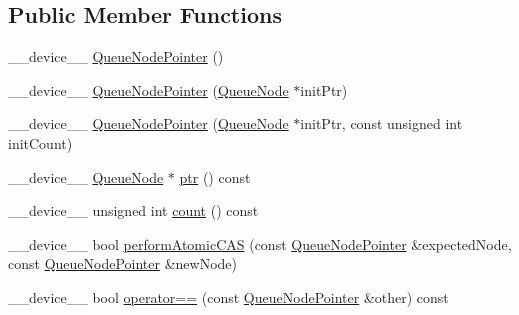 \subsection*{Public Member Functions}
\begin{DoxyCompactItemize}
\item 
\+\_\+\+\_\+device\+\_\+\+\_\+ \mbox{\hyperlink{class_lock_free_queue_g_p_u_1_1_lock_free_queue_1_1_queue_node_pointer_a398bfd1f12b6047f4552486566fb3dc8}{Queue\+Node\+Pointer}} ()
\item 
\+\_\+\+\_\+device\+\_\+\+\_\+ \mbox{\hyperlink{class_lock_free_queue_g_p_u_1_1_lock_free_queue_1_1_queue_node_pointer_aee8f8f4a0fe3b228ab37934d05051f02}{Queue\+Node\+Pointer}} (\mbox{\hyperlink{class_lock_free_queue_g_p_u_1_1_lock_free_queue_1_1_queue_node}{Queue\+Node}} $\ast$init\+Ptr)
\item 
\+\_\+\+\_\+device\+\_\+\+\_\+ \mbox{\hyperlink{class_lock_free_queue_g_p_u_1_1_lock_free_queue_1_1_queue_node_pointer_a5b8f7553a4a723392eb5c4b1ce7e3875}{Queue\+Node\+Pointer}} (\mbox{\hyperlink{class_lock_free_queue_g_p_u_1_1_lock_free_queue_1_1_queue_node}{Queue\+Node}} $\ast$init\+Ptr, const unsigned int init\+Count)
\item 
\+\_\+\+\_\+device\+\_\+\+\_\+ \mbox{\hyperlink{class_lock_free_queue_g_p_u_1_1_lock_free_queue_1_1_queue_node}{Queue\+Node}} $\ast$ \mbox{\hyperlink{class_lock_free_queue_g_p_u_1_1_lock_free_queue_1_1_queue_node_pointer_a3a8f5737220b153b6c3d5411251832cf}{ptr}} () const
\item 
\+\_\+\+\_\+device\+\_\+\+\_\+ unsigned int \mbox{\hyperlink{class_lock_free_queue_g_p_u_1_1_lock_free_queue_1_1_queue_node_pointer_a44656a2bd6b73d9b9028f63b49806bb4}{count}} () const
\item 
\+\_\+\+\_\+device\+\_\+\+\_\+ bool \mbox{\hyperlink{class_lock_free_queue_g_p_u_1_1_lock_free_queue_1_1_queue_node_pointer_a45e5ddb1d0f52a9f0b0b60626aac8b89}{perform\+Atomic\+C\+AS}} (const \mbox{\hyperlink{class_lock_free_queue_g_p_u_1_1_lock_free_queue_1_1_queue_node_pointer}{Queue\+Node\+Pointer}} \&expected\+Node, const \mbox{\hyperlink{class_lock_free_queue_g_p_u_1_1_lock_free_queue_1_1_queue_node_pointer}{Queue\+Node\+Pointer}} \&new\+Node)
\item 
\+\_\+\+\_\+device\+\_\+\+\_\+ bool \mbox{\hyperlink{class_lock_free_queue_g_p_u_1_1_lock_free_queue_1_1_queue_node_pointer_a6aa8cb1939d2481eb06f765dffa472f7}{operator==}} (const \mbox{\hyperlink{class_lock_free_queue_g_p_u_1_1_lock_free_queue_1_1_queue_node_pointer}{Queue\+Node\+Pointer}} \&other) const
\end{DoxyCompactItemize}
